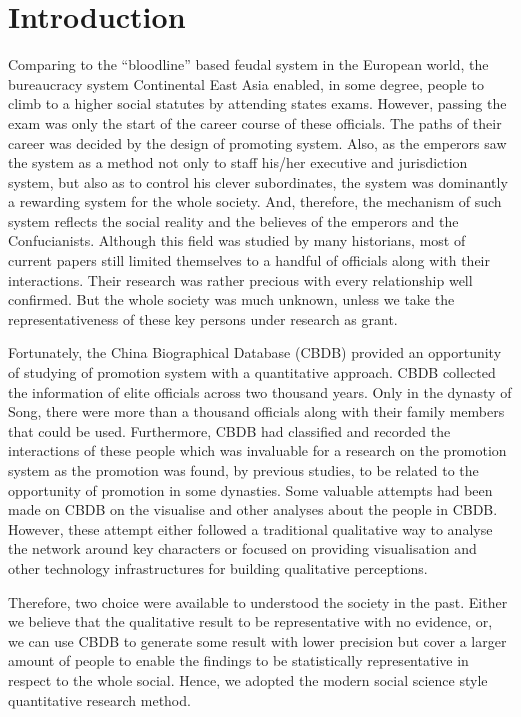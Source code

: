 \section{Introduction}

Comparing to the ``bloodline'' based feudal system in the European world, the bureaucracy system Continental East Asia enabled, in some degree, people to climb to a higher social statutes by attending states exams. However, passing the exam was only the start of the career course of these officials. The paths of their career was decided by the design of promoting system. Also, as the emperors saw the system as a method not only to staff his/her executive and jurisdiction system, but also as to control his clever subordinates, the system was dominantly a rewarding system for the whole society. And, therefore, the mechanism of such system reflects the social reality and the believes of the emperors and the Confucianists. Although this field was studied by many historians, most of current papers still limited themselves to a handful of officials along with their interactions. Their research was rather precious with every relationship well confirmed. But the whole society was much unknown, unless we take the representativeness of these key persons under research as grant. 

Fortunately, the China Biographical Database (CBDB) provided an opportunity of studying of promotion system with a quantitative approach. CBDB collected the information of elite officials across two thousand years. Only in the dynasty of Song, there were more than a thousand officials along with their family members that could be used. Furthermore, CBDB had classified and recorded the interactions of these people which was invaluable for a research on the promotion system as the promotion was found, by previous studies, to be related to the opportunity of promotion in some dynasties. Some valuable attempts had been made on CBDB on the visualise and other analyses about the people in CBDB. However, these attempt either followed a traditional qualitative way to analyse the network around key characters or focused on providing visualisation and other technology infrastructures for building qualitative perceptions. 

Therefore, two choice were available to understood the society in the past. Either we believe that the qualitative result to be representative with no evidence, or, we can use CBDB to generate some result with lower precision but cover a larger amount of people to enable the findings to be statistically representative in respect to the whole social. Hence, we adopted the modern social science style quantitative research method. 

